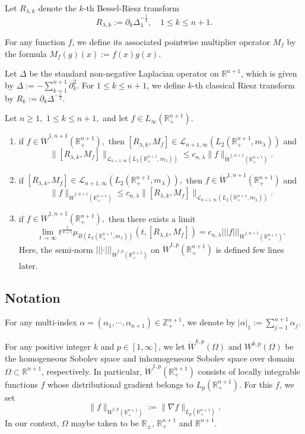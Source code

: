 \documentclass{amsart}
\begin{document}
Let $R_{\lambda,k}$ denote the $k$-th Bessel-Riesz transform
$$ R_{\lambda,k} :=\partial_{k} \Delta_\lambda^{-\frac12},\quad 1\leq k\leq n+1.$$

For any function $f$, we define its associated pointwise multiplier operator $M_f$ by the formula $M_f(g)(x):=f(x)g(x)$.

Let $\Delta$ be the standard non-negative Laplacian operator on $\mathbb{R}^{n+1}$, which is given by $\Delta:=-\sum_{k=1}^{n+1}\partial_{k}^2$. For $1\leq k\leq n+1$, we define $k$-th classical Riesz transform by $R_k:=\partial_k\Delta^{-\frac12}$.

\begin{theorem}\label{main theorem} Let $n\geq1,$ $1\leq k\leq n+1,$ and let $f\in L_{\infty}(\mathbb{R}^{n+1}_+).$
\begin{enumerate}[{\rm (i)}]
\item\label{mta} if $f\in\dot{W}^{1,n+1}(\mathbb{R}^{n+1}_+),$ then $[R_{\lambda,k},M_f]\in \mathcal{L}_{n+1,\infty}(L_2(\mathbb{R}^{n+1}_+,m_{\lambda}))$ and
$$\|[R_{\lambda,k},M_f]\|_{\mathcal{L}_{n+1,\infty}(L_2(\mathbb{R}^{n+1}_+,m_{\lambda}))}\leq c_{n,\lambda}\|f\|_{\dot{W}^{1,n+1}(\mathbb{R}^{n+1}_+)}.$$
\item\label{mtb} if $[R_{\lambda,k},M_f]\in \mathcal{L}_{n+1,\infty}(L_2(\mathbb{R}^{n+1}_+,m_{\lambda})),$ then $f\in\dot{W}^{1,n+1}(\mathbb{R}^{n+1}_+)$ and
$$\|f\|_{\dot{W}^{1,n+1}(\mathbb{R}^{n+1}_+)}\leq c_{n,\lambda}\|[R_{\lambda,k},M_f]\|_{\mathcal{L}_{n+1,\infty}(L_2(\mathbb{R}^{n+1}_+,m_{\lambda}))}.$$
\item\label{mtc} if $f\in\dot{W}^{1,n+1}(\mathbb{R}^{n+1}_+),$ then there exists a limit
$$\lim_{t\to\infty}t^{\frac1{n+1}}\mu_{B(L_2(\mathbb{R}^{n+1}_+,m_{\lambda}))}(t,[R_{\lambda,k},M_f])=c_{n,\lambda}|||f|||_{\dot{W}^{1,n+1}(\mathbb{R}_+^{n+1})}.$$
Here, the semi-norm $|||\cdot|||_{\dot{W}^{1,p}(\mathbb{R}_+^{n+1})}$ on $\dot{W}^{1,p}(\mathbb{R}_+^{n+1})$ is defined few lines later.
\end{enumerate}
\end{theorem}

\subsection{Notation}
For any multi-index $\alpha=(\alpha_1,\cdots,\alpha_{n+1})\in\mathbb{Z}_+^{n+1}$, we denote by $|\alpha|_1:=\sum_{j=1}^{n+1}\alpha_j.$

For any positive integer $k$ and $p\in [1,\infty]$, we let $\dot{W}^{k,p}(\Omega)$ and $W^{k,p}(\Omega)$ be the homogeneous Sobolev space and inhomogeneous Sobolev space over domain $\Omega\subset \mathbb{R}^{n+1}$, respectively. In particular, $\dot{W}^{1,p}(\mathbb{R}_+^{n+1})$ consists of locally integrable functions $f$ whose distributional gradient belongs to $L_p(\mathbb{R}_+^{n+1})$. For this $f$, we set
$$\|f\|_{\dot{W}^{1,p}(\mathbb{R}_+^{n+1})}:=\|\nabla f\|_{L_p(\mathbb{R}_+^{n+1})}.$$
In our context, $\Omega$ maybe taken to be $\mathbb{R}_\pm$, $\mathbb{R}_+^{n+1}$ and $\mathbb{R}^{n+1}$.
\end{document}
